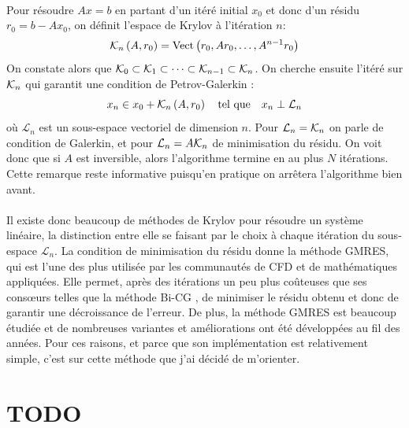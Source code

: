 		\paragraph{}
		Pour résoudre $Ax = b$ en partant d'un itéré initial $x_0$ et donc d'un résidu $r_0 = b - Ax_0$, on définit l'espace de Krylov à l'itération $n$:
		\begin{equation}\label{eqn:krylov}
			\krylov[A, r_0]{n} = \operatorname{Vect}\left(r_0, Ar_0, \dots, A^{n-1}r_0\right)
		\end{equation}
		On constate alors que $\krylov{0}\subset\krylov{1}\subset\dots\subset\krylov{n-1}\subset\krylov{n}$.
		On cherche ensuite l'itéré sur $\krylov{n}$ qui garantit une condition de Petrov-Galerkin \cite{SimonciniSzyld2007} :
		\begin{equation}\label{eqn:x_n}
			x_n \in x_0 + \krylov[A, r_0]{n}\quad\textrm{tel que}\quad x_n \perp \mathcal{L}_n
		\end{equation}
		où $\mathcal{L}_n$ est un sous-espace vectoriel de dimension $n$.
		Pour $\mathcal{L}_n = \krylov{n}$ on parle de condition de Galerkin, et pour $\mathcal{L}_n = A\krylov{n}$ de minimisation du résidu.
		On voit donc que si $A$ est inversible, alors l'algorithme termine en au plus $N$ itérations.
		Cette remarque reste informative puisqu'en pratique on arrêtera l'algorithme bien avant.

		\paragraph{}
		Il existe donc beaucoup de méthodes de Krylov pour résoudre un système linéaire, la distinction entre elle se faisant par le choix à chaque itération du sous-espace $\mathcal{L}_n$.
		La condition de minimisation du résidu donne la méthode GMRES, qui est l'une des plus utilisée par les communautés de CFD et de mathématiques appliquées.
		Elle permet, après des itérations un peu plus coûteuses que ses consœurs telles que la méthode Bi-CG \cite{TrefethenBau1997}, de minimiser le résidu obtenu et donc de garantir une décroissance de l'erreur.
		De plus, la méthode GMRES est beaucoup étudiée et de nombreuses variantes et améliorations ont été développées au fil des années.
		Pour ces raisons, et parce que son implémentation est relativement simple, c'est sur cette méthode que j'ai décidé de m'orienter.

\section{TODO}


